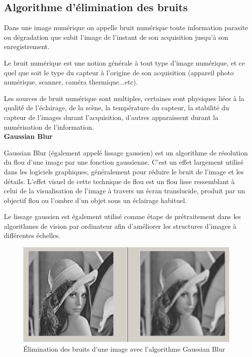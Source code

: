 \documentclass[12pt]{article}
\begin{document}
\subsection{Algorithme d'élimination des bruits}
Dans une image numérique on appelle bruit numérique toute information parasite ou dégradation que subit l'image de l'instant de son acquisition jusqu'à son enregistrement. 

Le bruit numérique est une notion générale à tout type d'image numérique, et ce quel que soit le type du capteur à l'origine de son acquisition (appareil photo numérique, scanner, caméra thermique...etc). 

Les sources de bruit numérique sont multiples, certaines sont physiques liées à la qualité de l’éclairage, de la scène, la température du capteur, la stabilité du capteur de l'images durant l'acquisition, d'autres apparaissent durant la numérisation de l'information.\\

\textbf{Gaussian Blur}

Gaussian Blur (également appelé lissage gaussien) est un algorithme de résolution du flou d'une image par une fonction gaussienne. C'est un effet largement utilisé dans les logiciels graphiques, généralement pour réduire le bruit de l'image et les détails. L’effet visuel de cette technique de flou est un flou lisse ressemblant à celui de la visualisation de l’image à travers un écran translucide, produit par un objectif flou ou l’ombre d’un objet sous un éclairage habituel. 

Le lissage gaussien est également utilisé comme étape de prétraitement dans les algorithmes de vision par ordinateur afin d'améliorer les structures d'images à différentes échelles.

\begin{figure}[h]
	\centering
	\includegraphics[width=13cm]{img-Chapiter-3/Blure.png}
	\caption{Élimination des bruits d'une image avec l'algorithme Gaussian Blur}
\end{figure}
\end{document}
